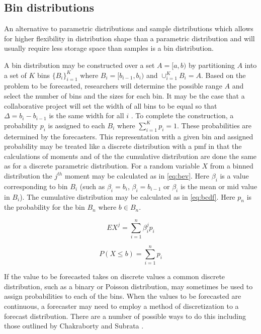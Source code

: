 \documentclass[11pt,notitlepage]{isuthesis}
\begin{document}
\subsection{Bin distributions}
An alternative to parametric distributions and sample distributions which allows
for higher flexibility in distribution shape than a parametric distribution and 
will usually require less storage space than samples is a bin 
distribution.

A bin distribution may be constructed over a set 
$A = [a, b)$ by partitioning $A$ into a set of $K$ bins $\{B_i\}_{i=1}^{K}$
where $B_i = [b_{i-1}, b_i)$ and $\cup_{i=1}^{K} B_i = A$. Based on the problem
to be forecasted, researchers will determine the possible range $A$ and 
select the number of bins and the sizes for each bin. It may be the case
that a collaborative project will set the width of all bins to be equal so that 
$\Delta = b_i - b_{i-1}$ is the same width for all $i$ 
\cite[]{mcgowan2019collaborative}.
To complete the construction, a probability $p_i$ is assigned to each $B_i$ 
where $\sum_{i=1}^{K}p_i = 1$. These probabilities are determined by the 
forecasters. 
This representation with a given bin and assigned probability may be 
treated like a discrete distribution with a pmf in that the calculations of 
moments and of the 
the cumulative distribution are done the same as for a discrete parametric 
distribution. For a random variable $X$ from a binned distribution 
the $j^{th}$ moment may be calculated as in \eqref{eq:bev}. 
Here $\beta_i$ is a value corresponding to bin $B_i$ (such as $\beta_i = b_i$,
$\beta_i = b_{i-1}$ or $\beta_i$ is the mean or mid value in $B_i$). The 
cumulative distribution may be calculated as in \eqref{eq:bcdf}.
Here $p_n$ is the probability for the bin $B_n$ where $b \in B_n$.

\begin{equation}
\label{eq:bev}
  EX^j = \sum_{i=1}^n \beta_i^j p_i
\end{equation}


\begin{equation}
\label{eq:bcdf}
  P(X \leq b) = \sum_{i=1}^n p_i
\end{equation}


If the value to be forecasted takes on discrete values a common discrete 
distribution, such as a binary or Poisson distribution, may sometimes be used to 
assign probabilities to each of the bins. When the values to be forecasted are
continuous, a forecaster may need to employ a method of discretization to a 
forecast distribution. There are a number of possible ways to do this including
those outlined by Chakraborty and Subrata \cite[]{chakraborty2015generating}.
\end{document}
